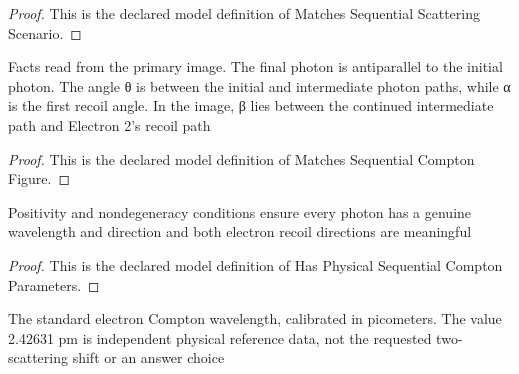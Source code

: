 \begin{proof}
  This is the declared model definition of Matches Sequential Scattering Scenario.
\end{proof}
\begin{definition}
  \label{def:physics:phyx-mini-0530:phyxminiproblems-problemphyxmini0530-matchessequentialcomptonfigure}
  Facts read from the primary image. The final photon is antiparallel to the initial photon. The angle θ is between the initial and intermediate photon paths, while α is the first recoil angle. In the image, β lies between the continued intermediate path and Electron 2's recoil path
\end{definition}
\begin{proof}
  This is the declared model definition of Matches Sequential Compton Figure.
\end{proof}
\begin{definition}
  \label{def:physics:phyx-mini-0530:phyxminiproblems-problemphyxmini0530-hasphysicalsequentialcomptonparameters}
  Positivity and nondegeneracy conditions ensure every photon has a genuine wavelength and direction and both electron recoil directions are meaningful
\end{definition}
\begin{proof}
  This is the declared model definition of Has Physical Sequential Compton Parameters.
\end{proof}
\begin{definition}
  \label{def:physics:phyx-mini-0530:phyxminiproblems-problemphyxmini0530-matcheselectroncomptonwavelengthreadout}
  The standard electron Compton wavelength, calibrated in picometers. The value 2.42631 pm is independent physical reference data, not the requested two-scattering shift or an answer choice
\end{definition}
